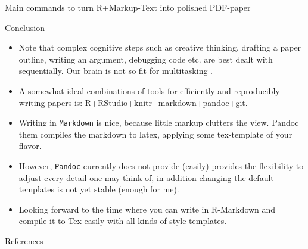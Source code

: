 \documentclass[final,hyperref={pdfpagelabels=false}]{beamer}
\begin{document}
\begin{frame}{}
\begin{columns}[t]
\begin{column}{.48\linewidth}
\begin{block}{Main commands to turn R+Markup-Text into polished PDF-paper}
        \end{block}
        
        
        
        \begin{block}{Conclusion}
            \begin{itemize}
            \item Note that complex cognitive steps such as creative thinking, drafting a paper outline, writing an argument, debugging code etc. are best dealt with sequentially. Our brain is not so fit for multitasking \cite{Clapp2011}.
             \item A somewhat ideal combinations of tools for efficiently and reproducibly writing papers is: R+RStudio+knitr+markdown+pandoc+git.    
             \item Writing in \texttt{Markdown} is nice, because little markup clutters the view. Pandoc them compiles the markdown to latex, applying some tex-template of your flavor.
             \item However,  \texttt{Pandoc} currently does not provide (easily) provides the flexibility to adjust every detail one may think of, in addition changing the default templates is not yet stable (enough for me). 
             \item Looking forward to the time where you can write in R-Markdown and compile it to Tex easily with all kinds of style-templates.
                \end{itemize}
        \end{block}     



     \begin{block}{References}
     \begin{tiny}
   
     
     
     \end{tiny}
     \end{block}     
   
   
         \end{column}
    \end{columns}
  \end{frame}
\end{document}
